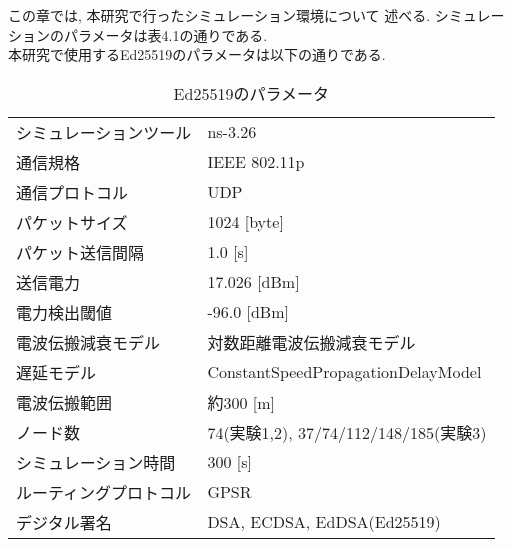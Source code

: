 この章では, 本研究で行ったシミュレーション環境について
述べる. シミュレーションのパラメータは表4.1の通りである.\\

本研究で使用するEd25519のパラメータは以下の通りである.\\
\setlength{\tabcolsep}{30pt}
\begin{longtable}{ll}
  \caption{Ed25519のパラメータ}
  \endfirsthead
  \hline
  シミュレーションツール & ns-3.26 \\
  通信規格 & IEEE 802.11p \\
  通信プロトコル & UDP \\
  パケットサイズ & 1024 [byte] \\
  パケット送信間隔 & 1.0 [s] \\
  送信電力 & 17.026 [dBm] \\
  電力検出閾値 & -96.0 [dBm] \\
  電波伝搬減衰モデル & 対数距離電波伝搬減衰モデル \\
  遅延モデル & ConstantSpeedPropagationDelayModel \\
  電波伝搬範囲 & 約300 [m] \\
  ノード数 & 74(実験1,2), 37/74/112/148/185(実験3) \\
  シミュレーション時間 & 300 [s] \\
  ルーティングプロトコル & GPSR \\
  デジタル署名 & DSA, ECDSA, EdDSA(Ed25519) \\ \hline
\end{longtable}







